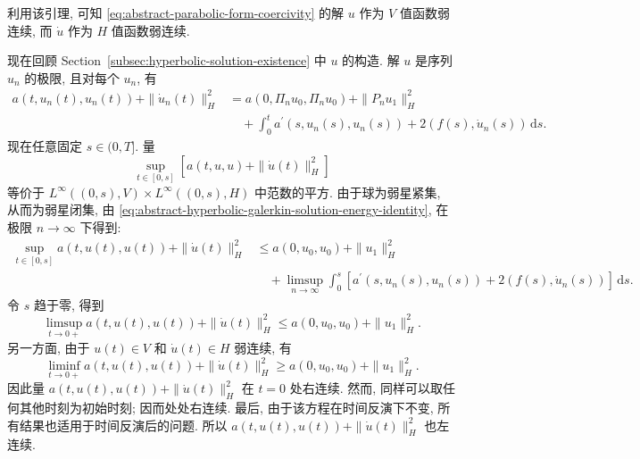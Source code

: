 利用该引理, 可知 \eqref{eq:abstract-parabolic-form-coercivity} 的解 $u$ 作为 $V$ 值函数弱连续, 而 $\dot u$ 作为 $H$ 值函数弱连续.

现在回顾 Section~\ref{subsec:hyperbolic-solution-existence} 中 $u$ 的构造. 解 $u$ 是序列 $u_n$ 的极限, 且对每个 $u_n$, 有
\begin{equation}\label{eq:abstract-hyperbolic-galerkin-solution-energy-identity}
\begin{aligned}a(t,u_n(t),u_n(t))+\|\dot u_n(t)\|_H^2&=a(0,\Pi_nu_0,\Pi_nu_0)+\|P_nu_1\|_H^2\\&\quad+\int_0^t a^{\prime}(s,u_n(s),u_n(s))+2(f(s),\dot u_n(s))\,\mathrm{d}s.\end{aligned}
\end{equation}
现在任意固定 $s\in(0,T]$. 量
\begin{equation}\label{eq:abstract-hyperbolic-sup-energy-equivalent-norm}
\sup_{t\in[0,s]}[a(t,u,u)+\|\dot u(t)\|_H^2]
\end{equation}
等价于 $L^\infty((0,s),V)\times L^\infty((0,s),H)$ 中范数的平方. 由于球为弱星紧集, 从而为弱星闭集, 由 \eqref{eq:abstract-hyperbolic-galerkin-solution-energy-identity}, 在极限 $n\to\infty$ 下得到:
\begin{equation}\label{eq:abstract-hyperbolic-limit-sup-energy-upper-bound}
\begin{aligned}\sup_{t\in[0,s]}a(t,u(t),u(t))+\|\dot u(t)\|_H^2&\leq a(0,u_0,u_0)+\|u_1\|_H^2\\&\quad+\limsup_{n\to\infty}\int_0^s[a^{\prime}(s,u_n(s),u_n(s))+2(f(s),\dot u_n(s))]\,\mathrm{d}s.\end{aligned}
\end{equation}
令 $s$ 趋于零, 得到
\begin{equation}\label{eq:abstract-hyperbolic-initial-right-limsup-energy}
\limsup_{t\to0+}a(t,u(t),u(t))+\|\dot u(t)\|_H^2\leq a(0,u_0,u_0)+\|u_1\|_H^2.
\end{equation}
另一方面, 由于 $u(t)\in V$ 和 $\dot u(t)\in H$ 弱连续, 有
\begin{equation}\label{eq:abstract-hyperbolic-initial-right-liminf-energy}
\liminf_{t\to0+}a(t,u(t),u(t))+\|\dot u(t)\|_H^2\geq a(0,u_0,u_0)+\|u_1\|_H^2.
\end{equation}
因此量 $a(t,u(t),u(t))+\|\dot u(t)\|_H^2$ 在 $t=0$ 处右连续. 然而, 同样可以取任何其他时刻为初始时刻; 因而处处右连续. 最后, 由于该方程在时间反演下不变, 所有结果也适用于时间反演后的问题. 所以 $a(t,u(t),u(t))+\|\dot u(t)\|_H^2$ 也左连续.

